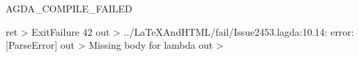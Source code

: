 AGDA_COMPILE_FAILED

ret > ExitFailure 42 out > ../LaTeXAndHTML/fail/Issue2453.lagda:10.14: error: [ParseError] out > Missing body for lambda out >
